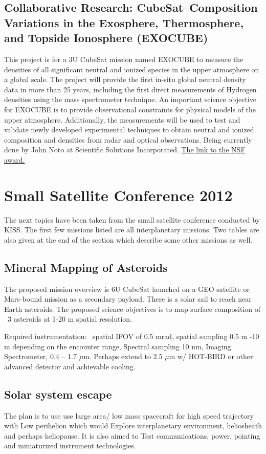 \documentclass[11pt,a4paper]{report}
\begin{document}
\subsection{Collaborative Research: CubeSat--Composition Variations in the Exosphere, Thermosphere, and Topside Ionosphere (EXOCUBE)}

This project is for a 3U CubeSat mission named EXOCUBE to measure the densities of all significant neutral and ionized species in the upper atmosphere on a global scale. The project will provide the first in-situ global neutral density data in more than 25 years, including the first direct measurements of Hydrogen densities using the mass spectrometer technique. An important science objective for EXOCUBE is to provide observational constraints for physical models of the upper atmosphere. Additionally, the measurements will be used to test and validate newly developed experimental techniques to obtain neutral and ionized composition and densities from radar and optical observations. Being currently done by John Noto at Scientific Solutions Incorporated. \href{http://nsf.gov/awardsearch/showAward?AWD_ID=1042837&HistoricalAwards=false}{The link to the NSF award.}


\section{Small Satellite Conference 2012}
The next topics have been taken from the small satellite conference conducted by KISS. The first few missions listed are all interplanetary missions. Two tables are also given at the end of the section which describe some other missions as well. 

\subsection{Mineral Mapping of Asteroids}
The proposed mission overview is 6U CubeSat launched on a GEO satellite 
or Mars-bound mission as a secondary payload. There is a solar sail to reach near Earth asteroids. The proposed science objectives is to map surface composition of ~3 asteroids at 1-20 m spatial resolution.

Required instrumentation: ~spatial IFOV of 0.5 mrad, spatial sampling 0.5 m -10 m depending on the encounter range, Spectral sampling 10 nm, Imaging Spectrometer, 0.4 – 1.7 $\mu$m. Perhaps extend to 2.5 $\mu$m w/ HOT-BIRD or 
other advanced detector and achievable cooling. 

\subsection{Solar system escape}
The plan is to use use large area/ low mass spacecraft for high speed trajectory with Low perihelion which would Explore interplanetary environment, heliosheath and perhaps heliopause. It is also aimed to Test communications, power, pointing and miniaturized instrument technologies.
\end{document}
